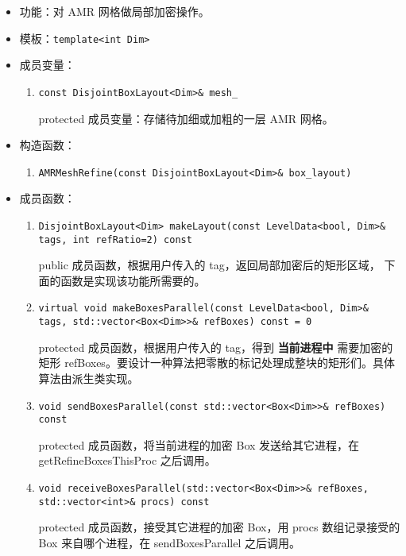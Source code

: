 \documentclass[cn, bibend=bibtex]{elegantpaper}
\theoremstyle{plain}
\begin{document}
\begin{itemize}
  \item 功能：对 AMR 网格做局部加密操作。
  \item 模板：\lstinline|template<int Dim>|
  \item 成员变量：
  \begin{enumerate}
    \item \lstinline|const DisjointBoxLayout<Dim>& mesh_|

    protected 成员变量：存储待加细或加粗的一层 AMR 网格。
  \end{enumerate}
  \item 构造函数：
  \begin{enumerate}
    \item \lstinline|AMRMeshRefine(const DisjointBoxLayout<Dim>& box_layout)|
  \end{enumerate}
  \item 成员函数：
  \begin{enumerate}
    \item \lstinline|DisjointBoxLayout<Dim> makeLayout(const LevelData<bool, Dim>& tags, int refRatio=2) const|

    public 成员函数，根据用户传入的 tag，返回局部加密后的矩形区域，
    下面的函数是实现该功能所需要的。

    \item \lstinline|virtual void makeBoxesParallel(const LevelData<bool, Dim>& tags, std::vector<Box<Dim>>& refBoxes) const = 0|
    
    protected 成员函数，根据用户传入的 tag，得到 \textbf{当前进程中} 需要加密的矩形 refBoxes。要设计一种算法把零散的标记处理成整块的矩形们。具体算法由派生类实现。

    \item \lstinline|void sendBoxesParallel(const std::vector<Box<Dim>>& refBoxes) const|

    protected 成员函数，将当前进程的加密 Box 发送给其它进程，在 getRefineBoxesThisProc 之后调用。

    \item \lstinline|void receiveBoxesParallel(std::vector<Box<Dim>>& refBoxes, std::vector<int>& procs) const|

    protected 成员函数，接受其它进程的加密 Box，用 procs 数组记录接受的 Box 来自哪个进程，在 sendBoxesParallel 之后调用。


  \end{enumerate}
\end{itemize}
\end{document}
